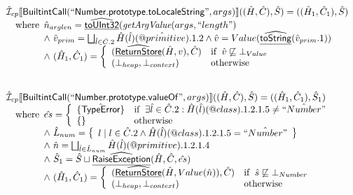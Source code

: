 \[\begin{array}{l}
\hat{\mathcal{I}} _{cp}\llbracket \mbox{\textsf{BuiltintCall}}(``\mbox{\textsf{Number.prototype.toLocaleString}}",args)\rrbracket((\hat{H},\hat{C}), \hat{S})
  = ((\hat{H}_1, \hat{C}_1), \hat{S})\\
\quad{\rm where}\begin{array}[t]{l}
  \hat{n}_{arglen} = \widehat{\underline{\sf toUInt32}}(\emph{getArgValue}(args, ``length")\\
  \land\ \hat{v}_{prim} = \bigsqcup_{\hat{l} \in \hat{C}.2} \hat{H}(\hat{l})(\hat{@primitive}).1.2
  \land \hat{v} = Value(\widehat{\underline{\sf toString}}(\hat{v}_{prim}.1))\\
  \land\ (\hat{H}_1, \hat{C}_1) = 
    \left\{\begin{array}{ll}
      (\widehat{\underline{\sf ReturnStore}}(\hat{H}, v), \hat{C})
      & {\rm if}\begin{array}[t]{l}\hat{v} \not\sqsubseteq \bot_{Value}\end{array}\\
      (\bot_{heap}, \bot_{context}) & {\rm otherwise} \\
    \end{array}\right.\\
  \end{array}\\
\\\\  
  
  
\hat{\mathcal{I}} _{cp}\llbracket \mbox{\textsf{BuiltintCall}}(``\mbox{\textsf{Number.prototype.valueOf}}",args)\rrbracket((\hat{H},\hat{C}), \hat{S})
  = ((\hat{H}_1, \hat{C}_1), \hat{S}_1)\\
\quad{\rm where}\begin{array}[t]{l}
  \hat{es} = \left\{\begin{array}{ll}
      \{\hat{\mbox{\textsf{TypeError}}}\} 
      & {\rm if}\begin{array}[t]{l}\exists \hat{l} \in \hat{C}.2:
          \hat{H}(\hat{l})(@class).1.2.1.5 \neq \hat{``Number"}\end{array}\\
      \left\{\begin{array}{l}\end{array}\right\} & {\rm otherwise}
    \end{array}\right.\\
  \land\ \hat{L}_{num} = 
    \left\{\begin{array}{l} l \mid l \in \hat{C}.2 \land  \hat{H}(\hat{l})(@class).1.2.1.5 = \hat{``Number"}\end{array}\right\}\\
  \land\ \hat{n} = \bigsqcup_{\hat{l} \in \hat{L}_{num}} \hat{H}(\hat{l})(@primitive).1.2.1.4\\
  \land\ \hat{S}_1 = \hat{S} \sqcup \widehat{\underline{\sf RaiseException}}(\hat{H}, \hat{C}, \hat{es})\\
  \land\ (\hat{H}_1, \hat{C}_1) = 
    \left\{\begin{array}{ll}
      (\widehat{\underline{\sf ReturnStore}}(\hat{H}, Value(\hat{n})), \hat{C})
      & {\rm if}\begin{array}[t]{l}\hat{s} \not\sqsubseteq \bot_{Number}\end{array}\\
      (\bot_{heap}, \bot_{context}) & {\rm otherwise} \\
    \end{array}\right.
  \end{array}\\
\\\\



\end{array}\]

